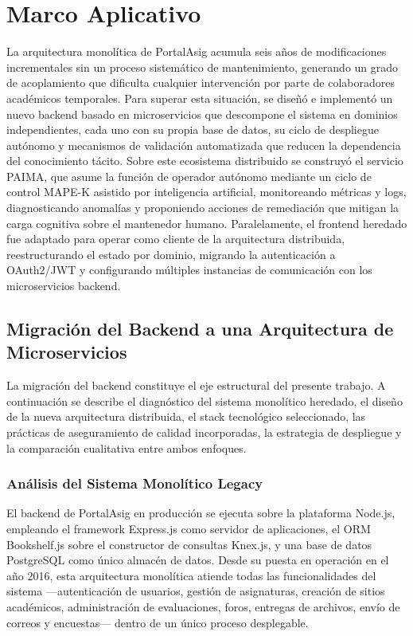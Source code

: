 \chapter{Marco Aplicativo}
\label{ch:aplicativo}
\pagestyle{fancy}

La arquitectura monolítica de PortalAsig acumula seis años de modificaciones
incrementales sin un proceso sistemático de mantenimiento, generando un grado de
acoplamiento que dificulta cualquier intervención por parte de colaboradores
académicos temporales. Para superar esta situación, se diseñó e implementó un
nuevo backend basado en microservicios que descompone el sistema en dominios
independientes, cada uno con su propia base de datos, su ciclo de despliegue
autónomo y mecanismos de validación automatizada que reducen la dependencia del
conocimiento tácito. Sobre este ecosistema distribuido se construyó el servicio
PAIMA, que asume la función de operador autónomo mediante un ciclo de control
MAPE-K asistido por inteligencia artificial, monitoreando métricas y logs,
diagnosticando anomalías y proponiendo acciones de remediación que mitigan la
carga cognitiva sobre el mantenedor humano. Paralelamente, el frontend
heredado fue adaptado para operar como cliente de la arquitectura distribuida,
reestructurando el estado por dominio, migrando la autenticación a OAuth2/JWT
y configurando múltiples instancias de comunicación con los microservicios
backend.

\section{Migración del Backend a una Arquitectura de Microservicios}

La migración del backend constituye el eje estructural del presente trabajo.
A continuación se describe el diagnóstico del sistema monolítico heredado,
el diseño de la nueva arquitectura distribuida, el stack tecnológico
seleccionado, las prácticas de aseguramiento de calidad incorporadas, la
estrategia de despliegue y la comparación cualitativa entre ambos enfoques.

\subsection{Análisis del Sistema Monolítico Legacy}\label{sec:analisis-monolito}

El backend de PortalAsig en producción se ejecuta sobre la plataforma Node.js,
empleando el framework Express.js como servidor de aplicaciones, el ORM Bookshelf.js
sobre el constructor de consultas Knex.js, y una base de datos PostgreSQL como único
almacén de datos. Desde su puesta en operación en el año 2016, esta arquitectura
monolítica atiende todas las funcionalidades del sistema —autenticación de usuarios,
gestión de asignaturas, creación de sitios académicos, administración de evaluaciones,
foros, entregas de archivos, envío de correos y encuestas— dentro de un único proceso
desplegable.


